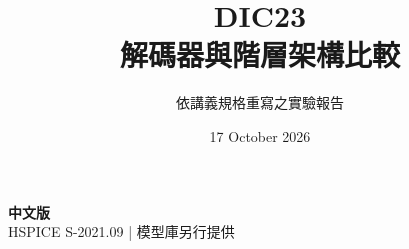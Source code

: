 \documentclass[11pt,a4paper]{article}
\title{\color{accent}DIC23\\[4pt]解碼器與階層架構比較}
\author{依講義規格重寫之實驗報告}
\date{17 October 2026}
\begin{document}
\maketitle
\begin{center}\small\textbf{中文版}\\
HSPICE S-2021.09 \quad | \quad 模型庫另行提供
\end{center}


\end{document}
